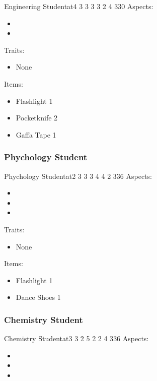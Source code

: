 \documentclass[11pt]{article}
\begin{document}
{\begin{npc}{Engineering Student}{at}{4 3 3 3 3 2 4 3}{30}
Aspects:
\begin{itemize}
\item {}
\item {}
\end{itemize}
\columnbreak

Traits:
\begin{itemize}
\item None
\end{itemize}

Items:
\begin{itemize}
\item Flashlight 1
\item Pocketknife 2
\item Gaffa Tape 1
\end{itemize}
\end{npc}
\subsubsection{Phychology Student}
\label{sec:orgd7b8d23}

\begin{npc}{Phychology Student}{at}{2 3 3 3 4 4 2 3}{36}
Aspects:
\begin{itemize}
\item {}
\item {}
\item {}
\end{itemize}
\columnbreak

Traits:
\begin{itemize}
\item None
\end{itemize}

Items:
\begin{itemize}
\item Flashlight 1
\item Dance Shoes 1
\end{itemize}
\end{npc}
\subsubsection{Chemistry Student}
\label{sec:org0ef6063}

\begin{npc}{Chemistry Student}{at}{3 3 2 5 2 2 4 3}{36}
Aspects:
\begin{itemize}
\item {}
\item {}
\item {}
\end{itemize}
\columnbreak


\end{npc}}
\end{document}
